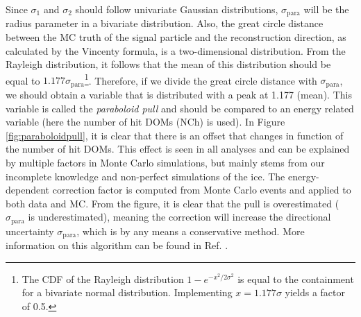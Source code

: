 \noindent Since $\sigma_1$ and $\sigma_2$ should follow univariate Gaussian distributions, $\sigma_\textrm{para}$ will be the radius parameter in a bivariate distribution. Also, the great circle distance between the MC truth of the signal particle and the reconstruction direction, as calculated by the Vincenty formula, is a two-dimensional distribution. From the Rayleigh distribution, it follows that the mean of this distribution should be equal to $1.177\sigma_\textrm{para}$\footnote{The CDF of the Rayleigh distribution $1-e^{-x^2/2\sigma^2}$ is equal to the containment for a bivariate normal distribution. Implementing $x=1.177\sigma$ yields a factor of 0.5.}. Therefore, if we divide the great circle distance with $\sigma_\textrm{para}$, we should obtain a variable that is distributed with a peak at 1.177 (mean). This variable is called the \textit{paraboloid pull} and should be compared to an energy related variable (here the number of hit DOMs (NCh) is used). In Figure \ref{fig:paraboloidpull}, it is clear that there is an offset that changes in function of the number of hit DOMs. This effect is seen in all analyses and can be explained by multiple factors in Monte Carlo simulations, but mainly stems from our incomplete knowledge and non-perfect simulations of the ice. The energy-dependent correction factor is computed from Monte Carlo events and applied to both data and MC. From the figure, it is clear that the pull is overestimated ($\sigma_\textrm{para}$ is underestimated), meaning the correction will increase the directional uncertainty $\sigma_\textrm{para}$, which is by any means a conservative method.
More information on this algorithm can be found in Ref. \cite{Neunhoffer:2004ha}.



